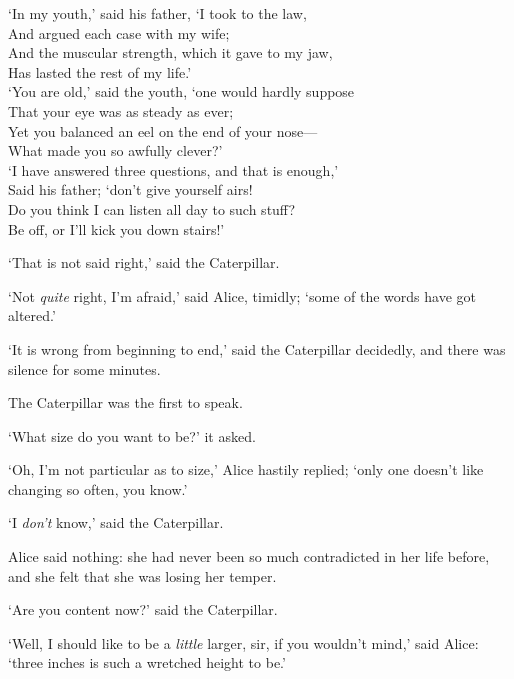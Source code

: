 \documentclass[12pt,openany]{memoir}
\renewenvironment{quote}%
  {\list{}{\leftmargin=2\parindent\rightmargin=0in}\item[]}%
  {\endlist}
\begin{document}
\begin{quote}
   `In my youth,' said his father, `I took to the law,\\
\hspace*{1em}    And argued each case with my wife;\\
   And the muscular strength, which it gave to my jaw,\\
\hspace*{1em}    Has lasted the rest of my life.'\\

   `You are old,' said the youth, `one would hardly suppose\\
\hspace*{1em}    That your eye was as steady as ever;\\
   Yet you balanced an eel on the end of your nose---\\
\hspace*{1em}    What made you so awfully clever?'\\

   `I have answered three questions, and that is enough,'\\
\hspace*{1em}    Said his father; `don't give yourself airs!\\
   Do you think I can listen all day to such stuff?\\
\hspace*{1em}    Be off, or I'll kick you down stairs!'
\end{quote}

`That is not said right,' said the Caterpillar.

`Not \textit{quite} right, I'm afraid,' said Alice, timidly; `some of the words have got altered.'

`It is wrong from beginning to end,' said the Caterpillar decidedly, and there was silence for some minutes.

The Caterpillar was the first to speak.

`What size do you want to be?' it asked.

`Oh, I'm not particular as to size,' Alice hastily replied; `only one doesn't like changing so often, you know.'

`I \textit{don't} know,' said the Caterpillar.

Alice said nothing: she had never been so much contradicted in her life before, and she felt that she was losing her temper.

`Are you content now?' said the Caterpillar.

`Well, I should like to be a \textit{little} larger, sir, if you wouldn't mind,' said Alice: `three inches is such a wretched height to be.'
\end{document}

